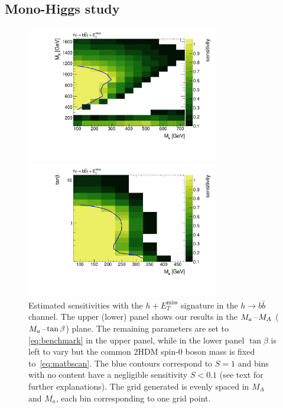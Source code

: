 \documentclass[review]{elsarticle}
\newcommand{\MET}{\ensuremath{E_T^\mathrm{miss}}\xspace}
\newcommand{\mA}{\ensuremath{M_{A}}\xspace}
\newcommand{\ma}{\ensuremath{M_{a}}\xspace}
\begin{document}
\subsection{Mono-Higgs study}
\label{sec:sensi_monohbb}

\begin{figure}[t!]
\centering
\includegraphics[width=0.75\textwidth]{mh4-mh3_scan_sensi-bb.pdf}

\vspace{2mm}

\includegraphics[width=0.75\textwidth]{mh4-tanbeta_scan_sensi-bb.pdf}
\vspace{2mm}
\caption{Estimated sensitivities with the $h+\MET$ signature in the $h \to b \bar b$ channel. The upper (lower) panel shows our results in the $\ma\hspace{0.25mm}$--$\hspace{0.25mm}\mA$ ($\ma\hspace{0.25mm}$--$\hspace{0.25mm}\tan \beta$) plane.  The remaining parameters are set to \eqref{eq:benchmark} in the upper panel, while in the lower panel $\tan \beta$ is left to vary but the common 2HDM  spin-0 boson  mass is fixed to~\eqref{eq:matbscan}. The blue contours correspond to $S =1$ and bins with no content have a negligible sensitivity $S<0.1$ (see text for further explanations). The grid generated is evenly spaced in \mA and \ma, each bin corresponding to one grid point.}
\label{fig:monoHbb_sensi}
\end{figure}
\end{document}
